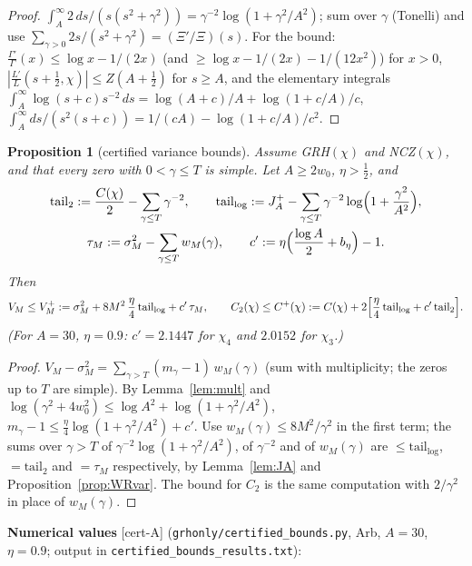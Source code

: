 \documentclass[11pt]{amsart}
\newtheorem{proposition}[theorem]{Proposition}
\theoremstyle{definition}
\numberwithin{equation}{section}
\newcommand{\certA}{\textsf{[cert-A]}}
\begin{document}
\begin{proof}
$\int_A^\infty2\,ds/(s(s^2+\gamma^2))
=\gamma^{-2}\log(1+\gamma^2/A^2)$; sum over $\gamma$ (Tonelli) and
use $\sum_{\gamma>0}2s/(s^2+\gamma^2)=(\Xi'/\Xi)(s)$. For the bound:
$\frac{\Gamma'}{\Gamma}(x)\le\log x-1/(2x)$ (and
$\ge\log x-1/(2x)-1/(12x^2)$) for $x>0$,
$|\frac{L'}{L}(s+\tfrac12,\chi)|\le Z(A+\tfrac12)$ for $s\ge A$, and
the elementary integrals
$\int_A^\infty\log(s+c)s^{-2}\,ds=\log(A+c)/A+\log(1+c/A)/c$,
$\int_A^\infty ds/(s^2(s+c))=1/(cA)-\log(1+c/A)/c^2$.
\end{proof}

\begin{proposition}[certified variance bounds]\label{prop:Vplus}
Assume GRH$(\chi)$ and NCZ$(\chi)$, and that every zero with
$0<\gamma\le T$ is simple. Let $A\ge2w_0$, $\eta>\tfrac12$, and
\begin{gather*}
\mathrm{tail}_2:=\frac{C(\chi)}2-\sum_{\gamma\le T}\gamma^{-2},
\qquad
\mathrm{tail}_{\log}:=J_A^+-\sum_{\gamma\le T}\gamma^{-2}
\log\Bigl(1+\frac{\gamma^2}{A^2}\Bigr),\\
\tau_M:=\sigma_M^2-\sum_{\gamma\le T}w_M(\gamma),
\qquad
c':=\eta\Bigl(\frac{\log A}2+b_\eta\Bigr)-1 .
\end{gather*}
Then
\[
V_M\le V_M^+:=\sigma_M^2+8M^2\,\frac\eta4\,\mathrm{tail}_{\log}
+c'\,\tau_M,
\qquad
C_2(\chi)\le C^+(\chi):=C(\chi)+2\Bigl[\frac\eta4\,\mathrm{tail}_{\log}
+c'\,\mathrm{tail}_2\Bigr].
\]
(For $A=30$, $\eta=0.9$: $c'=2.1447$ for $\chi_4$ and $2.0152$ for
$\chi_3$.)
\end{proposition}

\begin{proof}
$V_M-\sigma_M^2=\sum_{\gamma>T}(m_\gamma-1)\,w_M(\gamma)$ (sum with
multiplicity; the zeros up to $T$ are simple). By
Lemma~\ref{lem:mult} and
$\log(\gamma^2+4w_0^2)\le\log A^2+\log(1+\gamma^2/A^2)$,
$m_\gamma-1\le\frac\eta4\log(1+\gamma^2/A^2)+c'$. Use
$w_M(\gamma)\le8M^2/\gamma^2$ in the first term; the sums over
$\gamma>T$ of $\gamma^{-2}\log(1+\gamma^2/A^2)$, of $\gamma^{-2}$ and
of $w_M(\gamma)$ are $\le\mathrm{tail}_{\log}$, $=\mathrm{tail}_2$
and $=\tau_M$ respectively, by Lemma~\ref{lem:JA} and
Proposition~\ref{prop:WRvar}. The bound for $C_2$ is the same
computation with $2/\gamma^2$ in place of $w_M(\gamma)$.
\end{proof}

\noindent\textbf{Numerical values} \certA{}
(\texttt{grhonly/certified\_bounds.py}, Arb, $A=30$, $\eta=0.9$;
output in \texttt{certified\_bounds\_results.txt}):
\end{document}
